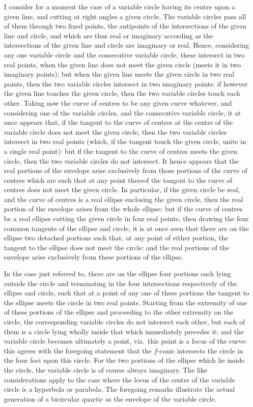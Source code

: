 \documentclass[11pt,a4paper]{article}
\begin{document}
I consider for a moment the case of a variable circle having its centre upon a given line, and cutting at right angles a given circle. The variable circles pass all of them through two fixed points, the antipoints of the intersections of the given line and circle, and which are thus real or imaginary according as the intersections of the given line and circle are imaginary or real. Hence, considering any one variable circle and the consecutive variable circle, these intersect in two real points, when the given line does not meet the given circle (meets it in two imaginary points); but when the given line meets the given circle in two real points, then the two variable circles intersect in two imaginary points: if however the given line touches the given circle, then the two variable circles touch each other. Taking now the curve of centres to be any given curve whatever, and considering one of the variable circles, and the consecutive variable circle, it at once appears that, if the tangent to the curve of centres at the centre of the variable circle does not meet the given circle, then the two variable circles intersect in two real points (which, if the tangent touch the given circle, unite in a single real point): but if the tangent to the curve of centres meets the given circle, then the two variable circles do not intersect. It hence appears that the real portions of the envelope arise exclusively from those portions of the curve of centres which are such that at any point thereof the tangent to the curve of centres does not meet the given circle. In particular, if the given circle be real, and the curve of centres is a real ellipse enclosing the given circle, then the real portion of the envelope arises from the whole ellipse: but if the curve of centres be a real ellipse cutting the given circle in four real points, then drawing the four common tangents of the ellipse and circle, it is at once seen that there are on the ellipse two detached portions such that, at any point of either portion, the tangent to the ellipse does not meet the circle: and the real portions of the envelope arise exclusively from these portions of the ellipse.

In the case just referred to, there are on the ellipse four portions each lying outside the circle and terminating in the four intersections respectively of the ellipse and circle, such that at a point of any one of these portions the tangent to the ellipse meets the circle in two real points. Starting from the extremity of one of these portions of the ellipse and proceeding to the other extremity on the circle, the corresponding variable circles do not intersect each other, but each of them is a circle lying wholly inside that which immediately precedes it; and the variable circle becomes ultimately a point, viz.\ this point is a focus of the curve: this agrees with the foregoing statement that the $f$-conic intersects the circle in the four foci upon this circle. For the two portions of the ellipse which lie inside the circle, the variable circle is of course always imaginary. The like considerations apply to the case where the locus of the centre of the variable circle is a hyperbola or parabola. The foregoing remarks illustrate the actual generation of a bicircular quartic as the envelope of the variable circle.
\end{document}
